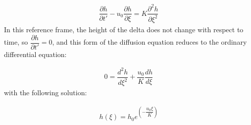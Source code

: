 \begin{align*}
	\dfrac{\partial h}{\partial t'} - u_0 \dfrac{\partial h}{\partial \xi} = K \dfrac{\partial^2 h}{\partial \xi^2} \label{eq:diffmrf}
\end{align*}
In this reference frame, the height of the delta does not change with respect to time, so \(\dfrac{\partial h}{\partial t'}=0\), and this form of the diffusion equation reduces to the ordinary differential equation:

\begin{align*}
	0 = \dfrac{d^2 h}{d \xi^2} + \dfrac{u_0}{K} \dfrac{d h}{d \xi}
\end{align*}
with the following solution:

\begin{align*}
	h(\xi) = h_0 e^{\left(-\dfrac{u_0 \xi}{K}\right)}
\end{align*}